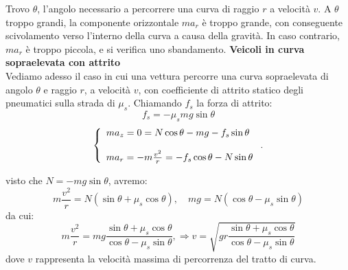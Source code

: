 \documentclass[a4paper,12pt]{article}
\begin{document}
Trovo $\theta$, l'angolo necessario a percorrere una curva di raggio $r$ a velocità $v$. A $\theta$ troppo grandi,
la componente orizzontale $ma_r$ è troppo grande, con conseguente scivolamento verso l'interno della curva a causa della gravità. In caso
contrario, $ma_r$ è troppo piccola, e si verifica uno sbandamento.
\newpage
\textbf{Veicoli in curva sopraelevata con attrito} \\
Vediamo adesso il caso in cui una vettura percorre una curva sopraelevata di angolo $\theta$ e raggio $r$, a velocità $v$, con
coefficiente di attrito statico degli pneumatici sulla strada di $\mu_s$. Chiamando $f_s$ la forza di attrito:
$$ f_s = -\mu_smg\sin{\theta}$$
$$
\begin{aligned}
\left\{\begin{array}{l}
    ma_z = 0 = N\cos{\theta} - mg - f_s\sin{\theta} \cr \\
    ma_r = -m\frac{v^2}{r} = -f_s\cos{\theta} - N\sin{\theta}
\end{array}\right..
\end{aligned}
$$

visto che $N = -mg\sin{\theta}$, avremo:
$$m\frac{v^2}{r} = N(\sin{\theta} + \mu_s\cos{\theta}), \quad mg = N(\cos{\theta - \mu_s\sin{\theta}}) $$
da cui:
$$ m\frac{v^2}{r} = mg\frac{\sin{\theta} + \mu_s\cos{\theta}}{\cos{\theta-\mu_s\sin{\theta}}}, \Rightarrow v = \sqrt{gr\frac{\sin{\theta} + \mu_s\cos{\theta}}{\cos{\theta-\mu_s\sin{\theta}}}}$$
dove $v$ rappresenta la velocità massima di percorrenza del tratto di curva.
\end{document}
